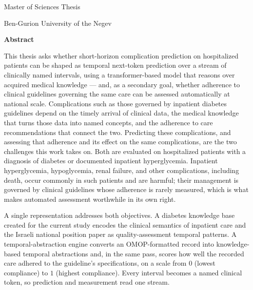 \thispagestyle{plain}

\begingroup
\singlespacing
\setlength{\parskip}{2pt}

\begin{center}
    \Large
    \thesistitle

    \vspace{0.2cm}
    \large
    \thesisauthorname

    \vspace{0.2cm}
    \large
    Master of Sciences Thesis

    \vspace{0.1cm}
    \large
    Ben-Gurion University of the Negev

    \vspace{0.1cm}
    \large
    \thesisyear

    \vspace{0.3cm}
    \Large
    \textbf{Abstract}
\end{center}

This thesis asks whether short-horizon complication prediction on hospitalized patients can be shaped as temporal next-token prediction over a stream of clinically named intervals, using a transformer-based model that reasons over acquired medical knowledge --- and, as a secondary goal, whether adherence to clinical guidelines governing the same care can be assessed automatically at national scale. Complications such as those governed by inpatient diabetes guidelines depend on the timely arrival of clinical data, the medical knowledge that turns those data into named concepts, and the adherence to care recommendations that connect the two. Predicting these complications, and assessing that adherence and its effect on the same complications, are the two challenges this work takes on. Both are evaluated on hospitalized patients with a diagnosis of diabetes or documented inpatient hyperglycemia. Inpatient hyperglycemia, hypoglycemia, renal failure, and other complications, including death, occur commonly in such patients and are harmful; their management is governed by clinical guidelines whose adherence is rarely measured, which is what makes automated assessment worthwhile in its own right.

A single representation addresses both objectives. A diabetes knowledge base created for the current study encodes the clinical semantics of inpatient care and the Israeli national position paper as quality-assessment temporal patterns. A temporal-abstraction engine converts an OMOP-formatted record into knowledge-based temporal abstractions and, in the same pass, scores how well the recorded care adhered to the guideline's specifications, on a scale from $0$ (lowest compliance) to $1$ (highest compliance). Every interval becomes a named clinical token, so prediction and measurement read one stream.

